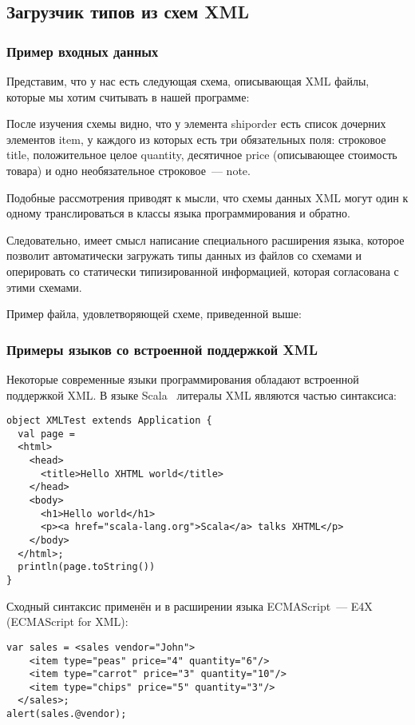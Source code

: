 \subsection{Загрузчик типов из схем XML}

\subsubsection{Пример входных данных}

Представим, что у нас есть следующая схема, описывающая XML файлы, которые мы хотим считывать в нашей программе:


После изучения схемы видно, что у элемента shiporder есть список дочерних элементов item, у каждого из которых есть три обязательных поля: строковое title, положительное целое quantity, десятичное price (описывающее стоимость товара) и одно необязательное строковое~--- note.

Подобные рассмотрения приводят к мысли, что схемы данных XML могут один к одному транслироваться в классы языка программирования и обратно.

Следовательно, имеет смысл написание специального расширения языка, которое позволит автоматически загружать типы данных из файлов со схемами и оперировать со статически типизированной информацией, которая согласована с этими схемами.

Пример файла, удовлетворяющей схеме, приведенной выше:


\subsubsection{Примеры языков со встроенной поддержкой XML}
Некоторые современные языки программирования обладают встроенной поддержкой XML.
В языке Scala~\cite{scala-spec} литералы XML являются частью синтаксиса: \td

\begin{lstlisting}
object XMLTest extends Application {
  val page = 
  <html>
    <head>
      <title>Hello XHTML world</title>
    </head>
    <body>
      <h1>Hello world</h1>
      <p><a href="scala-lang.org">Scala</a> talks XHTML</p>
    </body>
  </html>;
  println(page.toString())
}
\end{lstlisting}

Сходный синтаксис применён и в расширении языка ECMAScript~--- E4X~\cite{E4X} (ECMAScript for XML):

\begin{lstlisting}
var sales = <sales vendor="John">
    <item type="peas" price="4" quantity="6"/>
    <item type="carrot" price="3" quantity="10"/>
    <item type="chips" price="5" quantity="3"/>
  </sales>;
alert(sales.@vendor);
\end{lstlisting}

